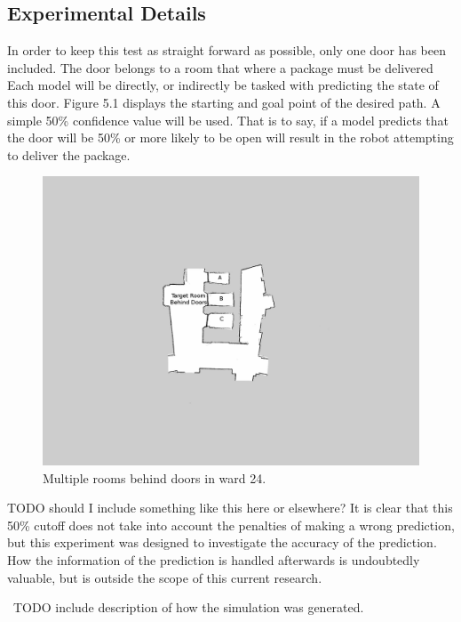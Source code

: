   \subsection{ Experimental Details }

  In order to keep this test as straight forward as possible, only one door has
  been included. The door belongs to a room that where a package must be
  delivered Each model will be directly, or indirectly be tasked with predicting
  the state of this door. Figure 5.1 displays the starting and goal point of
  the desired path. A simple 50\% confidence value will be used. That is to
  say, if a model predicts that the door will be 50\% or more likely to be open
  will result in the robot attempting to deliver the package.


  \begin{figure}[!htb]
    \centering
    \includegraphics[width=\linewidth]{images/ward_24_door.png}
    \caption{Multiple rooms behind doors in ward 24.}
    \label{figure:ward_24_door}
  \end{figure}

  TODO should I include something like this here or elsewhere?
  It is clear that this 50\% cutoff does not take into account the penalties of
  making a wrong prediction, but this experiment was designed to investigate the
  accuracy of the prediction. How the information of the prediction is handled
  afterwards is undoubtedly valuable, but is outside the scope of this current
  research.

  \
  TODO include description of how the simulation was generated.


